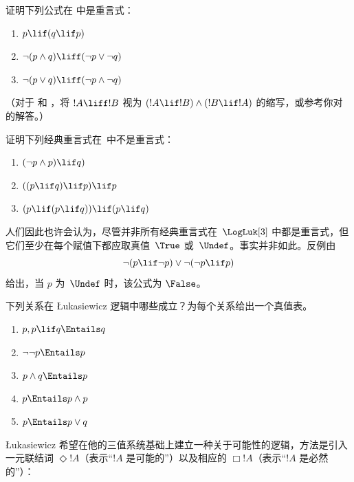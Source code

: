 \documentclass[../../../include/open-logic-section]{subfiles}
\begin{document}
\begin{prob}
  证明下列公式在 \LogLuk[3] 中是重言式：
  \begin{enumerate}
    \item $p \lif (q \lif p)$
    \item\label{mvl:thr:luk:prob:luk-taut-2} $\lnot(p \land q) \liff (\lnot p \lor \lnot q)$
    \item\label{mvl:thr:luk:prob:luk-taut-3} $\lnot(p \lor q) \liff (\lnot p \land \lnot q)$
  \end{enumerate}
  （对于  和 ，将 $!A \liff !B$ 视为 $(!A \lif !B) \land (!B \lif !A)$ 的缩写，或参考你对  的解答。）
\end{prob}

\begin{prob}
  证明下列经典重言式在~\LogLuk[3] 中不是重言式：
  \begin{enumerate}
    \item $(\lnot p \land p) \lif q)$
    \item $((p \lif q) \lif p) \lif p$
    \item $(p \lif (p \lif q)) \lif (p \lif q)$
  \end{enumerate}
\end{prob}

人们因此也许会认为，尽管并非所有经典重言式在~$\LogLuk[3]$ 中都是重言式，但它们至少在每个赋值下都应取真值~$\True$ 或~$\Undef$。事实并非如此。反例由 \[
  \lnot(p \lif \lnot p) \lor \lnot(\lnot p \lif p)
\] 给出，当 $p$ 为~$\Undef$ 时，该公式为 $\False$。

\begin{prob}
  下列关系在 \L ukasiewicz 逻辑中哪些成立？为每个关系给出一个真值表。
  \begin{enumerate}
    \item $p, p \lif q \Entails q$
    \item $\lnot\lnot p \Entails p$
    \item $p \land q \Entails p$
    \item $p \Entails p \land p$
    \item $p \Entails p \lor q$
  \end{enumerate}
\end{prob}

\L ukasiewicz 希望在他的三值系统基础上建立一种关于可能性的逻辑，方法是引入一元联结词 $\Diamond !A$（表示“$!A$ 是可能的”）以及相应的 $\Box !A$（表示“$!A$ 是必然的”）：
\end{document}
